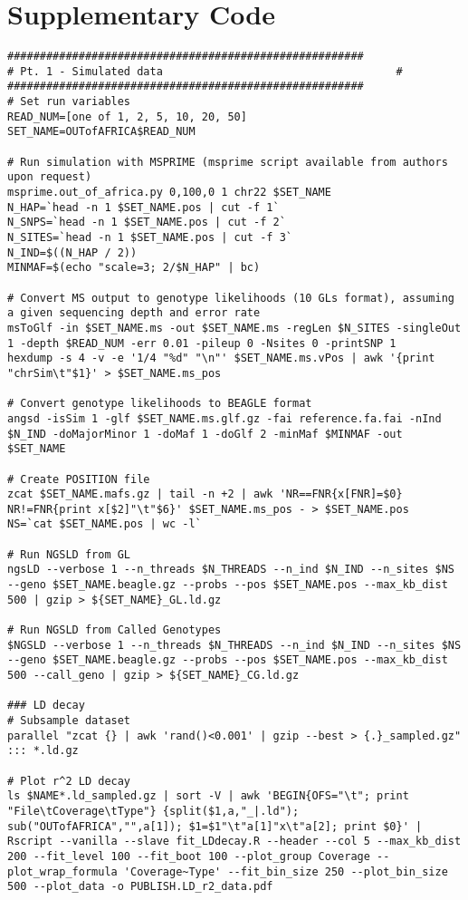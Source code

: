 \documentclass[a4paper]{article}
\begin{document}
\section{Supplementary Code}
\begin{lstlisting}
#######################################################
# Pt. 1 - Simulated data                                    #
#######################################################
# Set run variables
READ_NUM=[one of 1, 2, 5, 10, 20, 50]
SET_NAME=OUTofAFRICA$READ_NUM

# Run simulation with MSPRIME (msprime script available from authors upon request)
msprime.out_of_africa.py 0,100,0 1 chr22 $SET_NAME
N_HAP=`head -n 1 $SET_NAME.pos | cut -f 1`
N_SNPS=`head -n 1 $SET_NAME.pos | cut -f 2`
N_SITES=`head -n 1 $SET_NAME.pos | cut -f 3`
N_IND=$((N_HAP / 2))
MINMAF=$(echo "scale=3; 2/$N_HAP" | bc)

# Convert MS output to genotype likelihoods (10 GLs format), assuming a given sequencing depth and error rate
msToGlf -in $SET_NAME.ms -out $SET_NAME.ms -regLen $N_SITES -singleOut 1 -depth $READ_NUM -err 0.01 -pileup 0 -Nsites 0 -printSNP 1
hexdump -s 4 -v -e '1/4 "%d" "\n"' $SET_NAME.ms.vPos | awk '{print "chrSim\t"$1}' > $SET_NAME.ms_pos

# Convert genotype likelihoods to BEAGLE format
angsd -isSim 1 -glf $SET_NAME.ms.glf.gz -fai reference.fa.fai -nInd $N_IND -doMajorMinor 1 -doMaf 1 -doGlf 2 -minMaf $MINMAF -out $SET_NAME

# Create POSITION file
zcat $SET_NAME.mafs.gz | tail -n +2 | awk 'NR==FNR{x[FNR]=$0} NR!=FNR{print x[$2]"\t"$6}' $SET_NAME.ms_pos - > $SET_NAME.pos
NS=`cat $SET_NAME.pos | wc -l`  

# Run NGSLD from GL
ngsLD --verbose 1 --n_threads $N_THREADS --n_ind $N_IND --n_sites $NS --geno $SET_NAME.beagle.gz --probs --pos $SET_NAME.pos --max_kb_dist 500 | gzip > ${SET_NAME}_GL.ld.gz

# Run NGSLD from Called Genotypes
$NGSLD --verbose 1 --n_threads $N_THREADS --n_ind $N_IND --n_sites $NS --geno $SET_NAME.beagle.gz --probs --pos $SET_NAME.pos --max_kb_dist 500 --call_geno | gzip > ${SET_NAME}_CG.ld.gz

### LD decay
# Subsample dataset
parallel "zcat {} | awk 'rand()<0.001' | gzip --best > {.}_sampled.gz" ::: *.ld.gz

# Plot r^2 LD decay
ls $NAME*.ld_sampled.gz | sort -V | awk 'BEGIN{OFS="\t"; print "File\tCoverage\tType"} {split($1,a,"_|.ld"); sub("OUTofAFRICA","",a[1]); $1=$1"\t"a[1]"x\t"a[2]; print $0}' | Rscript --vanilla --slave fit_LDdecay.R --header --col 5 --max_kb_dist 200 --fit_level 100 --fit_boot 100 --plot_group Coverage --plot_wrap_formula 'Coverage~Type' --fit_bin_size 250 --plot_bin_size 500 --plot_data -o PUBLISH.LD_r2_data.pdf


\end{lstlisting}
\end{document}
